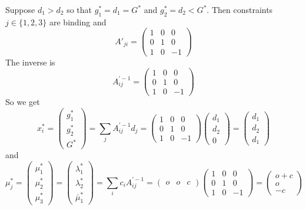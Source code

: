 \documentclass[final,3p,times]{elsarticle}
\def\l{\lambda}
\def\m{\mu}
\begin{document}
Suppose $d_1 > d_2$ so that $g_1^* = d_1 = G^*$ and $g_2^* = d_2 < G^*$. Then constraints $j\in \{1,2,3\}$ are binding and
\begin{equation}
A'_{ji}=\left(\begin{matrix}
 1 & 0 & 0\\
 0 & 1 & 0\\
 1 & 0 & -1
\end{matrix}\right)
\end{equation}
The inverse is
\begin{equation}
 A^{\prime -1}_{ij}
=\left(\begin{matrix}
 1 & 0 & 0\\
 0 & 1 & 0\\
 1 & 0 & -1
\end{matrix}\right)
\end{equation}
So we get
\begin{equation}
x^*_i = \left(\begin{matrix}
 g^*_1\\
 g^*_2\\
 G^*
\end{matrix}\right) = \sum_j A^{\prime -1}_{ij} d_j
=\left(\begin{matrix}
 1 & 0 & 0\\
 0 & 1 & 0\\
 1 & 0 & -1
\end{matrix}\right)\left(\begin{matrix}
 d_1\\
 d_2\\
 0
\end{matrix}\right) = \left(\begin{matrix}
 d_1\\
 d_2\\
 d_1
\end{matrix}\right)
\end{equation}
and
\begin{equation}
\m^*_j =\left(\begin{matrix}
 \m^*_1\\
 \m^*_2\\
 \m^*_3
\end{matrix}\right) =\left(\begin{matrix}
 \l_1^*\\
 \l_2^*\\
 \bar{\m}^*_1
\end{matrix}\right) = \sum_i c_i A^{\prime -1}_{ij}
= \left(\begin{matrix}
 o &
 o &
 c
\end{matrix}\right) \left(\begin{matrix}
 1 & 0 & 0\\
 0 & 1 & 0\\
 1 & 0 & -1
\end{matrix}\right) = \left(\begin{matrix}
 o + c \\
 o\\
 -c
\end{matrix}\right)
\end{equation}
\end{document}
